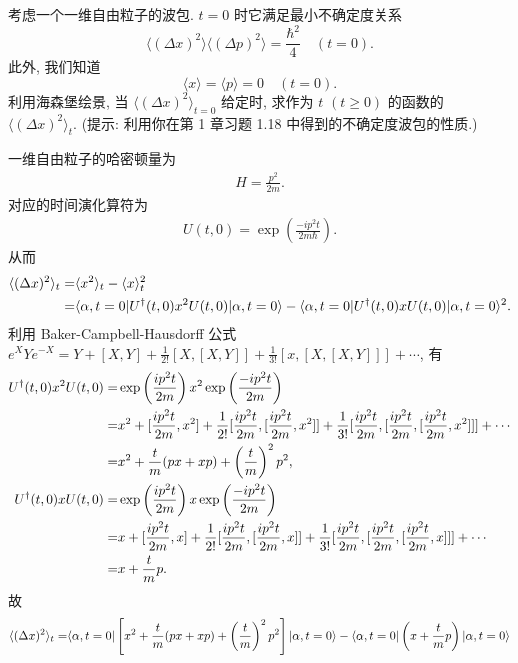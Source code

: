 \documentclass{assignment}
\begin{document}
\begin{prob}[课本习题 2.8]
    考虑一个一维自由粒子的波包. $t=0$ 时它满足最小不确定度关系
    \[
        \langle(\Delta x)^2\rangle\langle(\Delta p)^2\rangle=\frac{\hbar^2}{4}\quad(t=0).
    \]
    此外, 我们知道
    \[
        \langle x\rangle=\langle p\rangle=0\quad(t=0).
    \]
    利用海森堡绘景, 当 $\langle(\Delta x)^2\rangle_{t=0}$ 给定时, 求作为 $t$ $(t\geq 0)$ 的函数的 $\langle(\Delta x)^2\rangle_t$. (提示: 利用你在第 1 章习题 1.18 中得到的不确定度波包的性质.)
\end{prob}
\begin{sol}
    一维自由粒子的哈密顿量为
    \begin{align}
        H=\frac{p^2}{2m}.
    \end{align}
    对应的时间演化算符为
    \begin{align}
        U(t,0)=\exp\left(\frac{-ip^2t}{2m\hbar}\right).
    \end{align}
    从而
    \begin{align}
        \notag\langle(\Delta x)^2\rangle_t=&\langle x^2\rangle_t-\langle x\rangle_t^2\\
        =&\langle\alpha,t=0\rvert U^{\dagger}(t,0)x^2U(t,0)\lvert\alpha,t=0\rangle-\langle\alpha,t=0\rvert U^{\dagger}(t,0)xU(t,0)\lvert\alpha,t=0\rangle^2.
    \end{align}
    利用 Baker-Campbell-Hausdorff 公式 $e^XYe^{-X}=Y+[X,Y]+\frac{1}{2!}[X,[X,Y]]+\frac{1}{3!}[x,[X,[X,Y]]]+\cdots$, 有
    \begin{align}
        \notag U^{\dagger}(t,0)x^2U(t,0)=&\exp\left(\frac{ip^2t}{2m}\right)x^2\exp\left(\frac{-ip^2t}{2m}\right)\\
        \notag=&x^2+[\frac{ip^2t}{2m},x^2]+\frac{1}{2!}[\frac{ip^2t}{2m},[\frac{ip^2t}{2m},x^2]]+\frac{1}{3!}[\frac{ip^2t}{2m},[\frac{ip^2t}{2m},[\frac{ip^2t}{2m},x^2]]]+\cdots\\
        =&x^2+\frac{t}{m}(px+xp)+\left(\frac{t}{m}\right)^2p^2,\\
        \notag U^{\dagger}(t,0)xU(t,0)=&\exp\left(\frac{ip^2t}{2m}\right)x\exp\left(\frac{-ip^2t}{2m}\right)\\
        \notag=&x+[\frac{ip^2t}{2m},x]+\frac{1}{2!}[\frac{ip^2t}{2m},[\frac{ip^2t}{2m},x]]+\frac{1}{3!}[\frac{ip^2t}{2m},[\frac{ip^2t}{2m},[\frac{ip^2t}{2m},x]]]+\cdots\\
        =&x+\frac{t}{m}p.
    \end{align}
    故
    \begin{align}
        \notag\langle(\Delta x)^2\rangle_t=&\langle\alpha,t=0\rvert\left[x^2+\frac{t}{m}(px+xp)+\left(\frac{t}{m}\right)^2p^2\right]\lvert\alpha,t=0\rangle-\langle\alpha,t=0\rvert\left(x+\frac{t}{m}p\right)\lvert\alpha,t=0\rangle\\

\end{align}
\end{sol}
\end{document}
